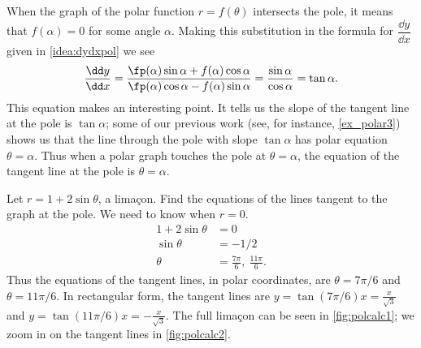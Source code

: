 When the graph of the polar function $r=f(\theta)$ intersects the pole, it means that $f(\alpha) = 0$ for some angle $\alpha$. Making this substitution in the formula for $\dfrac{\dd y}{\dd x}$ given in \autoref{idea:dydxpol} we see
\[
 \frac{\dd y}{\dd x}
 =\frac{\fp(\alpha)\sin\alpha+f(\alpha)\cos\alpha}{\fp(\alpha)\cos\alpha-f(\alpha)\sin\alpha}
 =\frac{\sin\alpha}{\cos\alpha}
 =\tan\alpha.
\]
%
This equation makes an interesting point. It tells us the slope of the tangent line at the pole is $\tan \alpha$; some of our previous work (see, for instance, \autoref{ex_polar3}) shows us that the line through the pole with slope $\tan \alpha$ has polar equation $\theta=\alpha$. Thus when a polar graph touches the pole at $\theta=\alpha$, the equation of the tangent line at the pole is $\theta=\alpha$.

\begin{example}\label{ex_polcalc2}
Let $r=1+2\sin\theta$, a limaçon. Find the equations of the lines tangent to the graph at the pole.
%
\solution
We need to know when $r=0$. 
\begin{align*}
1+2\sin\theta &= 0\\
\sin\theta &= -1/2\\
\theta &= \frac{7\pi}{6},\ \frac{11\pi}6.
\end{align*}
Thus the equations of the tangent lines, in polar coordinates, are $\theta = 7\pi/6$ and $\theta = 11\pi/6$. In rectangular form, the tangent lines are $y=\tan(7\pi/6)x=\frac x{\sqrt3}$ and $y=\tan(11\pi/6)x=-\frac x{\sqrt3}$. The full limaçon can be seen in \autoref{fig:polcalc1}; we zoom in on the tangent lines in \autoref{fig:polcalc2}.
\end{example}

